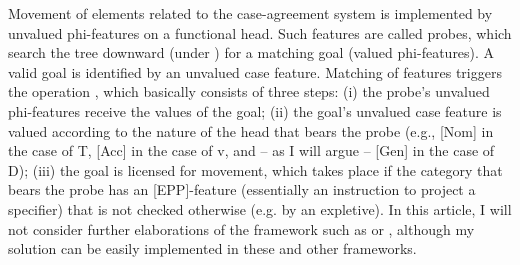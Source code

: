 \documentclass[output=paper]{langsci/langscibook}
\begin{document}
Movement of elements related to the case-agreement system is implemented by unvalued phi-features on a functional head. Such features are called probes, which search the tree downward (under ) for a matching goal (valued phi-features). A valid goal is identified by an unvalued case feature. Matching of features triggers the operation , which basically consists of three steps: (i) the probe’s unvalued phi-features receive the values of the goal; (ii) the goal’s unvalued case feature is valued according to the nature of the head that bears the probe (e.g., [Nom] in the case of T, [Acc] in the case of v, and – as I will argue – [Gen] in the case of D); (iii) the goal is licensed for movement, which takes place if the category that bears the probe has an [EPP]-feature (essentially an instruction to project a specifier) that is not checked otherwise (e.g. by an expletive). In this article, I will not consider further elaborations of the  framework such as \citet{Pesetsky2007} or \citet{Zeijlstra2012}, although my solution can be easily implemented in these and other frameworks.
\end{document}
